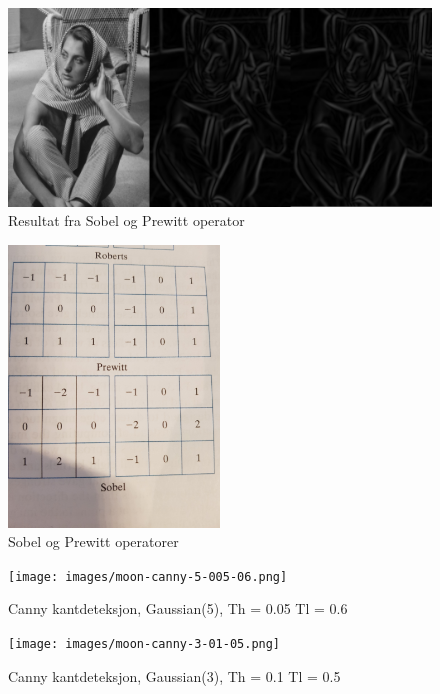 \documentclass[a4paper, 12pt]{article}
\begin{document}
\begin{figure}[h]
  \centering
  \includegraphics[width=1.0\textwidth]{images/barbara_prewitt_sobel}
  \caption{Resultat fra Sobel og Prewitt operator}
  \label{fig:sobprew}
\end{figure}


\begin{figure}[h]
  \centering
  \includegraphics[width=0.5\textwidth, angle=270]{images/matrix}
  \caption{Sobel og Prewitt operatorer}
  \label{fig:mat}
\end{figure}


\begin{figure}[h]
  \centering
  \texttt{[image: images/moon-canny-5-005-06.png]}
  \caption{Canny kantdeteksjon, Gaussian(5), Th = 0.05 Tl = 0.6}
  \label{fig:canny-moon-1}
\end{figure}


\begin{figure}[h]
  \centering
  \texttt{[image: images/moon-canny-3-01-05.png]}
  \caption{Canny kantdeteksjon, Gaussian(3), Th = 0.1 Tl = 0.5}
  \label{fig:canny-moon-2}
\end{figure}
\end{document}
